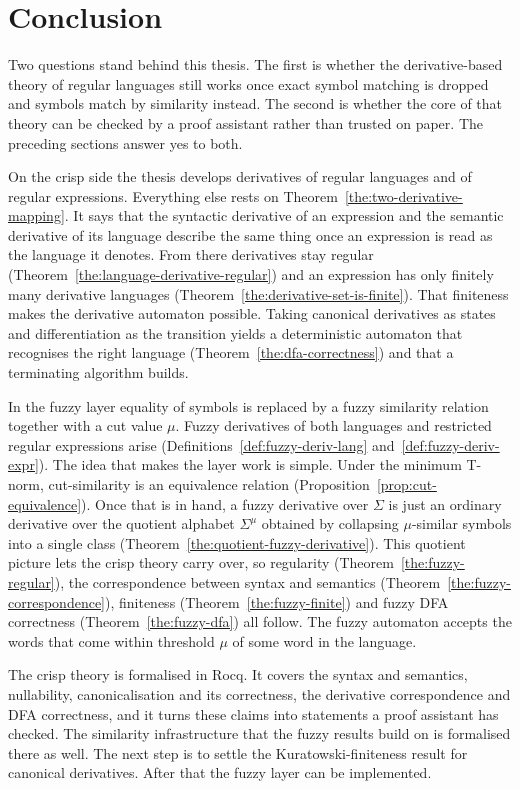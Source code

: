 \section{Conclusion}\label{sec:conclusion}

Two questions stand behind this thesis. The first is whether the derivative-based
theory of regular languages still works once exact symbol matching is dropped and
symbols match by similarity instead. The second is whether the core of that theory
can be checked by a proof assistant rather than trusted on paper. The preceding
sections answer yes to both.

On the crisp side the thesis develops derivatives of
regular languages and of regular expressions. Everything else rests on
Theorem~\ref{the:two-derivative-mapping}. It says that the syntactic derivative
of an expression and the semantic derivative of its language describe the same
thing once an expression is read as the language it denotes. From there derivatives
stay regular (Theorem~\ref{the:language-derivative-regular}) and an expression has only
finitely many derivative languages (Theorem~\ref{the:derivative-set-is-finite}).
That finiteness makes the derivative automaton possible. Taking
canonical derivatives as states and differentiation as the transition yields a
deterministic automaton that recognises the right language
(Theorem~\ref{the:dfa-correctness}) and that a terminating algorithm
builds.

In the fuzzy layer equality of symbols is replaced by a fuzzy similarity relation
together with a cut value $\mu$. Fuzzy derivatives of both languages and restricted regular
expressions arise
(Definitions~\ref{def:fuzzy-deriv-lang} and~\ref{def:fuzzy-deriv-expr}). The idea
that makes the layer work is simple. Under the minimum
T-norm, cut-similarity is an equivalence relation
(Proposition~\ref{prop:cut-equivalence}). Once that is in hand, a fuzzy derivative
over $\Sigma$ is just an ordinary derivative over the quotient alphabet
$\Sigma^{\mu}$ obtained by collapsing $\mu$-similar symbols into a single class
(Theorem~\ref{the:quotient-fuzzy-derivative}). This quotient picture lets
the crisp theory carry over, so regularity
(Theorem~\ref{the:fuzzy-regular}), the correspondence between syntax and semantics
(Theorem~\ref{the:fuzzy-correspondence}), finiteness
(Theorem~\ref{the:fuzzy-finite}) and fuzzy DFA correctness
(Theorem~\ref{the:fuzzy-dfa}) all follow. The fuzzy automaton
accepts the words that come within threshold $\mu$ of some word in the
language.

The crisp theory is formalised in Rocq. It covers the
syntax and semantics, nullability, canonicalisation and its correctness, the
derivative correspondence and DFA correctness, and it turns these claims into
statements a proof assistant has checked. The similarity infrastructure that the
fuzzy results build on is formalised there as well. The next step is to settle the
Kuratowski-finiteness result for canonical derivatives. After that the fuzzy layer
can be implemented.

